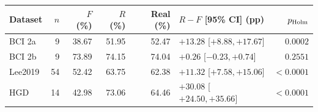 \begin{tabular}{@{}lrrrrlr@{}}
\toprule
Dataset & $n$ & $F$ (\%) & $R$ (\%) & Real (\%) & $R-F$ [95\% CI] (pp) & $p_{\rm Holm}$ \\
\midrule
BCI 2a & 9 & 38.67 & 51.95 & 52.47 & $+13.28$ [$ +8.88, +17.67 $] & $0.0002$ \\
BCI 2b & 9 & 73.89 & 74.15 & 74.04 & $+0.26$ [$ -0.23, +0.74 $] & $0.2551$ \\
Lee2019 & 54 & 52.42 & 63.75 & 62.38 & $+11.32$ [$ +7.58, +15.06 $] & $<0.0001$ \\
HGD & 14 & 42.98 & 73.06 & 64.46 & $+30.08$ [$ +24.50, +35.66 $] & $<0.0001$ \\
\bottomrule
\end{tabular}
